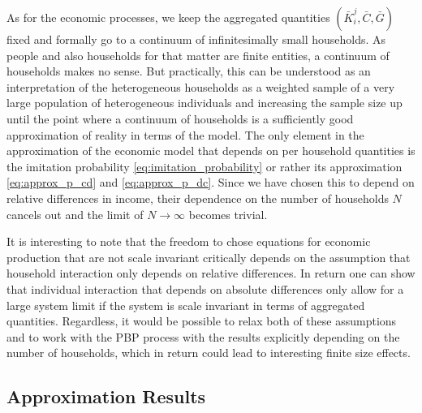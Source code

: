 As for the economic processes, we keep the aggregated quantities $(\bar{K}_i^j, \bar{C}, \bar{G})$ fixed and formally go to a continuum of infinitesimally small households. As people and also households for that matter are finite entities, a continuum of households makes no sense. But practically, this can be understood as an interpretation of the heterogeneous households as a weighted sample of a very large population of heterogeneous individuals and increasing the sample size up until the point where a continuum of households is a sufficiently good approximation of reality in terms of the model. 
The only element in the approximation of the economic model that depends on per household quantities is the imitation probability \eqref{eq:imitation_probability} or rather its approximation \eqref{eq:approx_p_cd} and \eqref{eq:approx_p_dc}. Since we have chosen this to depend on relative differences in income, their dependence on the number of households $N$ cancels out and the limit of $N \rightarrow \infty$ becomes trivial.

It is interesting to note that the freedom to chose equations for economic production that are not scale invariant critically depends on the assumption that household interaction only depends on relative differences. In return one can show that individual interaction that depends on absolute differences only allow for a large system limit if the system is scale invariant in terms of aggregated quantities. Regardless, it would be possible to relax both of these assumptions and to work with the PBP process with the results explicitly depending on the number of households, which in return could lead to interesting finite size effects.


\subsection{Approximation Results}

